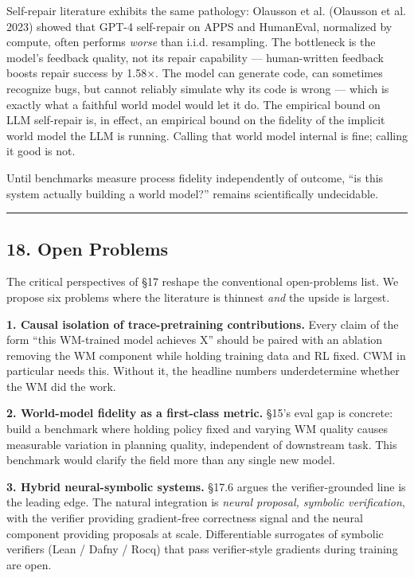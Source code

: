 \documentclass{article}
\begin{document}
Self-repair literature exhibits the same pathology: Olausson et al.
(Olausson et al. 2023) showed that GPT-4 self-repair on APPS and
HumanEval, normalized by compute, often performs \emph{worse} than
i.i.d. resampling. The bottleneck is the model's feedback quality, not
its repair capability --- human-written feedback boosts repair success
by 1.58×. The model can generate code, can sometimes recognize bugs, but
cannot reliably simulate why its code is wrong --- which is exactly what
a faithful world model would let it do. The empirical bound on LLM
self-repair is, in effect, an empirical bound on the fidelity of the
implicit world model the LLM is running. Calling that world model
internal is fine; calling it good is not.

Until benchmarks measure process fidelity independently of outcome, ``is
this system actually building a world model?'' remains scientifically
undecidable.

\begin{center}\rule{0.5\linewidth}{0.5pt}\end{center}

\hypertarget{open-problems}{%
\subsection{18. Open Problems}\label{open-problems}}

The critical perspectives of §17 reshape the conventional open-problems
list. We propose six problems where the literature is thinnest
\emph{and} the upside is largest.

\textbf{1. Causal isolation of trace-pretraining contributions.} Every
claim of the form ``this WM-trained model achieves X'' should be paired
with an ablation removing the WM component while holding training data
and RL fixed. CWM in particular needs this. Without it, the headline
numbers underdetermine whether the WM did the work.

\textbf{2. World-model fidelity as a first-class metric.} §15's eval gap
is concrete: build a benchmark where holding policy fixed and varying WM
quality causes measurable variation in planning quality, independent of
downstream task. This benchmark would clarify the field more than any
single new model.

\textbf{3. Hybrid neural-symbolic systems.} §17.6 argues the
verifier-grounded line is the leading edge. The natural integration is
\emph{neural proposal, symbolic verification}, with the verifier
providing gradient-free correctness signal and the neural component
providing proposals at scale. Differentiable surrogates of symbolic
verifiers (Lean / Dafny / Rocq) that pass verifier-style gradients
during training are open.
\end{document}
